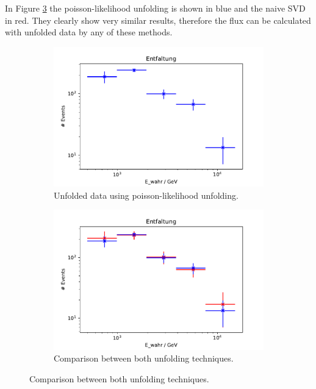 In Figure \ref{fig:vgl} the poisson-likelihood unfolding 
is shown in blue and the naive SVD in red. 
They clearly show very similar results, therefore the flux 
can be calculated with unfolded data by any of these methods.

\begin{figure}[H]
\centering
\begin{subfigure}{0.45\textwidth}
  \includegraphics[width=\textwidth]{plots/Entfaltung_2.pdf}
  \caption{Unfolded data using poisson-likelihood unfolding.\label{fig:pois}}
\end{subfigure}
\begin{subfigure}{0.45\textwidth}
  \includegraphics[width=\textwidth]{plots/Entfaltung_vgl.pdf}
  \caption{Comparison between both unfolding techniques.\label{fig:vgl}}
\end{subfigure}
\end{figure}

